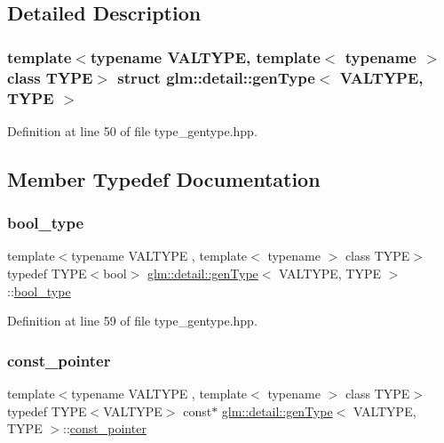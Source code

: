 \subsection{Detailed Description}
\subsubsection*{template$<$typename V\+A\+L\+T\+Y\+PE, template$<$ typename $>$ class T\+Y\+PE$>$\newline
struct glm\+::detail\+::gen\+Type$<$ V\+A\+L\+T\+Y\+P\+E, T\+Y\+P\+E $>$}



Definition at line 50 of file type\+\_\+gentype.\+hpp.



\subsection{Member Typedef Documentation}
\mbox{\label{structglm_1_1detail_1_1gen_type_ac338f0b4e47d5daa9c8e5411f0d37554}} 
\subsubsection{\texorpdfstring{bool\+\_\+type}{bool\_type}}
{\footnotesize\ttfamily template$<$typename V\+A\+L\+T\+Y\+PE , template$<$ typename $>$ class T\+Y\+PE$>$ \\
typedef T\+Y\+PE$<$bool$>$ \hyperlink{structglm_1_1detail_1_1gen_type}{glm\+::detail\+::gen\+Type}$<$ V\+A\+L\+T\+Y\+PE, T\+Y\+PE $>$\+::\hyperlink{structglm_1_1detail_1_1gen_type_ac338f0b4e47d5daa9c8e5411f0d37554}{bool\+\_\+type}}



Definition at line 59 of file type\+\_\+gentype.\+hpp.

\mbox{\label{structglm_1_1detail_1_1gen_type_ade82fbfd7b15096223e1b133c148b5e2}} 
\subsubsection{\texorpdfstring{const\+\_\+pointer}{const\_pointer}}
{\footnotesize\ttfamily template$<$typename V\+A\+L\+T\+Y\+PE , template$<$ typename $>$ class T\+Y\+PE$>$ \\
typedef T\+Y\+PE$<$V\+A\+L\+T\+Y\+PE$>$ const$\ast$ \hyperlink{structglm_1_1detail_1_1gen_type}{glm\+::detail\+::gen\+Type}$<$ V\+A\+L\+T\+Y\+PE, T\+Y\+PE $>$\+::\hyperlink{structglm_1_1detail_1_1gen_type_ade82fbfd7b15096223e1b133c148b5e2}{const\+\_\+pointer}}



